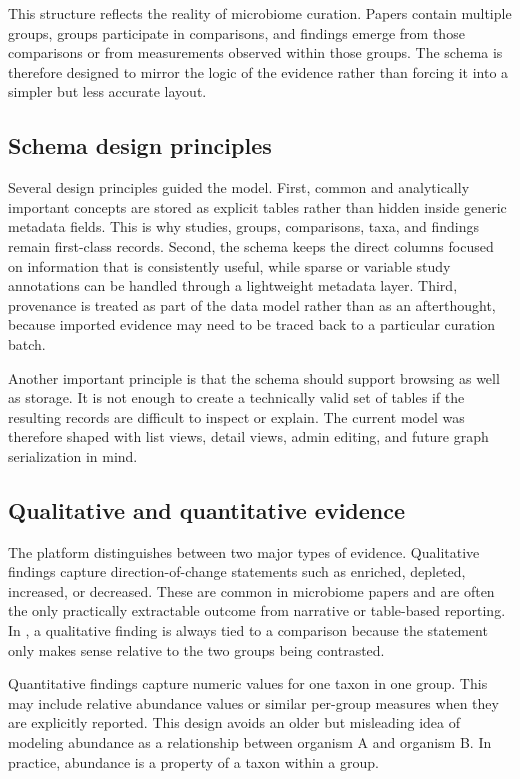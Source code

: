 This structure reflects the reality of microbiome curation. Papers contain multiple groups, groups participate in comparisons, and findings emerge from those comparisons or from measurements observed within those groups. The schema is therefore designed to mirror the logic of the evidence rather than forcing it into a simpler but less accurate layout.

\subsection{Schema design principles}

Several design principles guided the model. First, common and analytically important concepts are stored as explicit tables rather than hidden inside generic metadata fields. This is why studies, groups, comparisons, taxa, and findings remain first-class records. Second, the schema keeps the direct columns focused on information that is consistently useful, while sparse or variable study annotations can be handled through a lightweight metadata layer. Third, provenance is treated as part of the data model rather than as an afterthought, because imported evidence may need to be traced back to a particular curation batch.

Another important principle is that the schema should support browsing as well as storage. It is not enough to create a technically valid set of tables if the resulting records are difficult to inspect or explain. The current model was therefore shaped with list views, detail views, admin editing, and future graph serialization in mind.

\subsection{Qualitative and quantitative evidence}

The platform distinguishes between two major types of evidence. Qualitative findings capture direction-of-change statements such as enriched, depleted, increased, or decreased. These are common in microbiome papers and are often the only practically extractable outcome from narrative or table-based reporting. In \projectname{}, a qualitative finding is always tied to a comparison because the statement only makes sense relative to the two groups being contrasted.

Quantitative findings capture numeric values for one taxon in one group. This may include relative abundance values or similar per-group measures when they are explicitly reported. This design avoids an older but misleading idea of modeling abundance as a relationship between organism A and organism B. In practice, abundance is a property of a taxon within a group.

